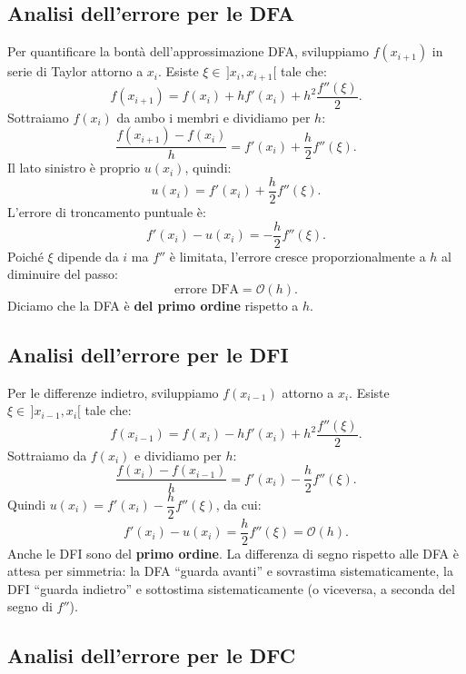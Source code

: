 \documentclass[a4paper,12pt]{article}
\theoremstyle{definition}
\theoremstyle{remark}
\begin{document}
\subsection{Analisi dell'errore per le DFA}

Per quantificare la bontà dell'approssimazione DFA, sviluppiamo
$f(x_{i+1})$ in serie di Taylor attorno a $x_i$.
Esiste $\xi \in \,]x_i, x_{i+1}[$ tale che:
\[
  f(x_{i+1}) = f(x_i) + h f'(x_i) + h^2 \frac{f''(\xi)}{2}.
\]
Sottraiamo $f(x_i)$ da ambo i membri e dividiamo per $h$:
\[
  \frac{f(x_{i+1}) - f(x_i)}{h} = f'(x_i) + \frac{h}{2} f''(\xi).
\]
Il lato sinistro è proprio $u(x_i)$, quindi:
\[
  u(x_i) = f'(x_i) + \frac{h}{2} f''(\xi).
\]
L'errore di troncamento puntuale è:
\[
  f'(x_i) - u(x_i) = -\frac{h}{2} f''(\xi).
\]
Poiché $\xi$ dipende da $i$ ma $f''$ è limitata, l'errore cresce
proporzionalmente a $h$ al diminuire del passo:
\[
  \text{errore DFA} = \mathcal{O}(h).
\]
Diciamo che la DFA è \textbf{del primo ordine} rispetto a $h$.

\subsection{Analisi dell'errore per le DFI}

Per le differenze indietro, sviluppiamo $f(x_{i-1})$ attorno a $x_i$.
Esiste $\xi \in \,]x_{i-1}, x_i[$ tale che:
\[
  f(x_{i-1}) = f(x_i) - h f'(x_i) + h^2 \frac{f''(\xi)}{2}.
\]
Sottraiamo da $f(x_i)$ e dividiamo per $h$:
\[
  \frac{f(x_i) - f(x_{i-1})}{h} = f'(x_i) - \frac{h}{2} f''(\xi).
\]
Quindi $u(x_i) = f'(x_i) - \dfrac{h}{2} f''(\xi)$, da cui:
\[
  f'(x_i) - u(x_i) = \frac{h}{2} f''(\xi) = \mathcal{O}(h).
\]
Anche le DFI sono del \textbf{primo ordine}.
La differenza di segno rispetto alle DFA è attesa per simmetria:
la DFA ``guarda avanti'' e sovrastima sistematicamente, la DFI
``guarda indietro'' e sottostima sistematicamente (o viceversa,
a seconda del segno di $f''$).

\subsection{Analisi dell'errore per le DFC}
\end{document}
